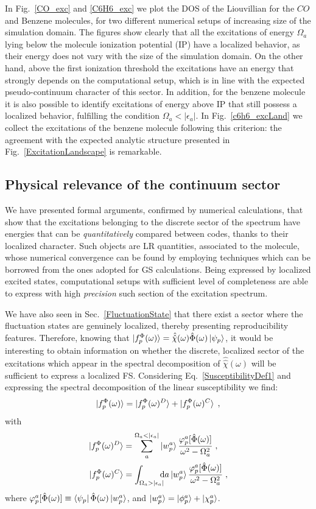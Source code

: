 \documentclass[reprint,aps,prb]{revtex4-1}
\newcommand{\dd}{{\rm d}}
\newcommand{\eps}{\epsilon}
\newcommand{\be}{\begin{equation}}
\newcommand{\ee}{\end{equation}}
\newcommand{\nn}{\notag}
\newcommand{\lb}{\label}
\newcommand{\op}[1]{\hat {#1}}
\newcommand{\sop}[1]{\op{\op {#1}}}
\newcommand{\fscd}[1]{\ket{f_p^\Phi(\omega)^{#1}}}
\begin{document}
In Fig.~\ref{CO_exc} and \ref{C6H6_exc} we plot the DOS of the Liouvillian for the $CO$  and Benzene molecules,
for two different numerical setups of increasing size of the simulation domain.
The figures show clearly that all the excitations of energy $\Omega_a$ lying below the
molecule ionization potential (IP) have a localized behavior, as their energy does not vary with the size of the simulation domain.
On the other hand, above the first ionization threshold the excitations have an energy that strongly depends on the computational
setup, which is in line with the expected pseudo-continuum character of this sector.
In addition, for the benzene molecule it is also possible to
identify excitations of energy above IP that still possess a localized behavior, fulfilling the condition $\Omega_a < |\eps_a|$.
In Fig.~\ref{c6h6_excLand} we collect the excitations of the benzene molecule following this criterion:
the agreement with the expected analytic structure presented in Fig.~\ref{ExcitationLandscape} is remarkable.

\subsection{Physical relevance of the continuum sector}

We have presented formal arguments, confirmed by numerical calculations, that show that
the excitations belonging to the discrete sector of the spectrum have energies
that can be \emph{quantitatively} compared between codes, thanks to their
localized character.
Such objects are LR quantities, associated to the molecule, whose numerical convergence
can be found by employing techniques which can be borrowed from the ones adopted for GS calculations. Being expressed by localized excited states,
computational setups with sufficient level of completeness are able to
express with high \emph{precision} such section of the excitation spectrum.

We have also seen in Sec.~\ref{FluctuationState} that
there exist a sector where the fluctuation states are genuinely localized, thereby presenting reproducibility features. Therefore,
knowing that $\ket{f_p^\Phi(\omega)} =\sop \chi(\omega) \op \Phi(\omega) \ket{\psi_p}$,
it would be interesting to obtain information on whether the discrete, localized sector of the excitations which appear in the spectral decomposition of $\sop \chi(\omega)$
will be sufficient to express a localized FS.
Considering Eq.~\eqref{SusceptibilityDef1} and
expressing the spectral decomposition of the linear susceptibility we find:
\be
\ket{f_p^\Phi(\omega)} = \fscd{D} + \fscd{C}
\lb{FSExcitationDef1} \;,
\ee
with
\begin{align}
 \fscd{D} &= \sum_a^{\Omega_a < |\eps_a|} \ket{w_p^a} \frac{\varphi_p^a[\op \Phi(\omega)]}{\omega^2-\Omega_a^2} \;, \nn \\
 \fscd{C}
 &= \int_{\Omega_a > |\eps_a|} \!\!\!\!\dd a \ket{w_p^a} \frac{\varphi_p^a[\op \Phi(\omega)]}{\omega^2-\Omega_a^2} \;, \nn
\end{align}
where $\varphi_p^a[\op \Phi(\omega)] \equiv \bra{\psi_p}\op\Phi(\omega)\ket{w_p^a}$,
and $\ket{w_p^a}=\ket{\phi_p^a}+\ket{\chi_p^a}$.
\end{document}
